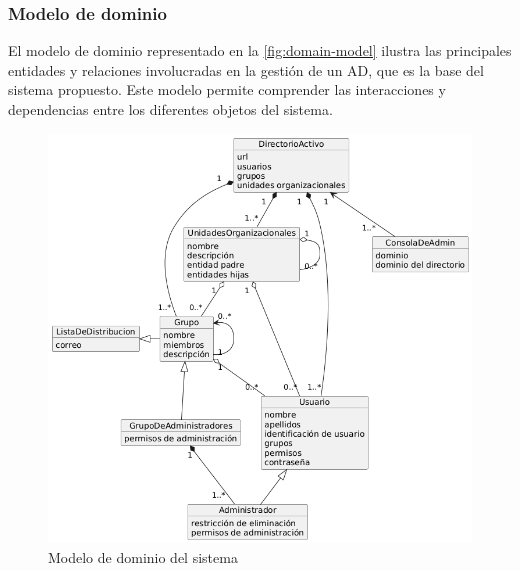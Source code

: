 \subsubsection{Modelo de dominio}

El modelo de dominio representado en la \autoref{fig:domain-model} ilustra las principales entidades y relaciones involucradas en la gestión de un AD, que es la base del sistema propuesto. Este modelo permite comprender las interacciones y dependencias entre los diferentes objetos del sistema.

\begin{figure}[H]
    \centering
    \includegraphics[width=\linewidth]{images/puml/domain-diagram/domain diagram.png}
    \caption{Modelo de dominio del sistema}
    \label{fig:domain-model}
\end{figure}